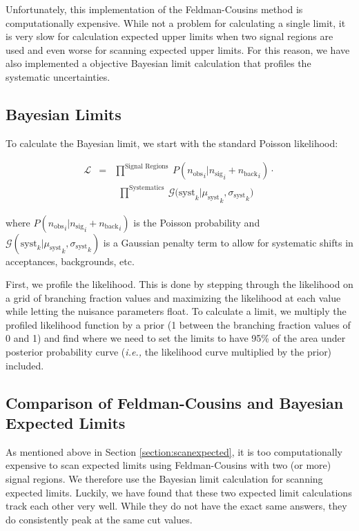 Unfortunately, this implementation of the Feldman-Cousins method is
computationally expensive.  While not a problem for calculating a
single limit, it is very slow for calculation expected upper limits
when two signal regions are used and even worse for scanning expected
upper limits.  For this reason, we have also implemented a objective
Bayesian limit calculation that profiles the systematic uncertainties.

\subsection{Bayesian Limits}
\label{section:baysianlimits}

To calculate the Bayesian limit, we start with the standard Poisson
likelihood:

\begin{eqnarray}
{\mathcal L}  &=& \prod^\textrm{Signal Regions } P({n_\textrm{obs}}_i | {n_\textrm{sig}}_i + {n_\textrm{back}}_i) \cdot \nonumber\\
&& ~~ \prod^\textrm{Systematics} ~ {{\mathcal G} (\textrm{syst}}_k| {\mu_\textrm{syst}}_k, {\sigma_\textrm{syst}}_k)
\end{eqnarray}

where $ P({n_\textrm{obs}}_i | {n_\textrm{sig}}_i +
{n_\textrm{back}}_i)$ is the Poisson probability and $ {\mathcal G}
(\textrm{syst}_k| {\mu_\textrm{syst}}_k, {\sigma_\textrm{syst}}_k)$ is
a Gaussian penalty term to allow for systematic shifts in acceptances,
backgrounds, etc.

First, we profile the likelihood.  This is done by stepping through
the likelihood on a grid of branching fraction values and maximizing
the likelihood at each value while letting the nuisance parameters
float.  To calculate a limit, we multiply the profiled likelihood
function by a prior (1 between the branching fraction values of 0 and
1) and find where we need to set the limits to have 95\% of the area
under posterior probability curve ({\em i.e.,} the likelihood curve
multiplied by the prior) included.


\subsection{Comparison of Feldman-Cousins and Bayesian  Expected Limits}
\label{section:compBayesFC}

As mentioned above in Section \ref{section:scanexpected}, it is too
computationally expensive to scan expected limits using
Feldman-Cousins with two (or more) signal regions.  We therefore use
the Bayesian limit calculation for scanning expected limits.  Luckily,
we have found that these two expected limit calculations track each
other very well.  While they do not have the exact same answers, they
do consistently peak at the same cut values.

